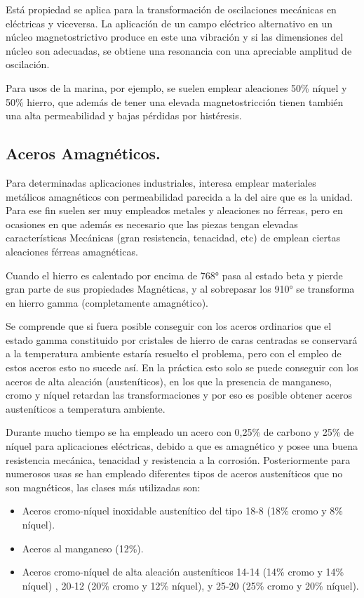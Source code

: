 \documentclass[12pt,a4paper]{article}
\begin{document}
Está propiedad se aplica para la transformación de oscilaciones mecánicas en eléctricas y viceversa. La aplicación de un campo eléctrico alternativo en un núcleo magnetostrictivo produce en este una vibración y si las dimensiones del núcleo son adecuadas, se obtiene una resonancia con una apreciable amplitud de oscilación.

Para usos de la marina, por ejemplo, se suelen emplear aleaciones 50\% níquel y 50\% hierro, que además de tener una elevada magnetostricción tienen también una alta permeabilidad y bajas pérdidas por histéresis.

\subsection{Aceros Amagnéticos.}

Para determinadas aplicaciones industriales, interesa emplear materiales metálicos amagnéticos con permeabilidad parecida a la del aire que es la unidad. Para ese fin suelen ser muy empleados metales y aleaciones no férreas, pero en ocasiones en que además es necesario que las piezas tengan elevadas características Mecánicas (gran resistencia, tenacidad, etc) de emplean ciertas aleaciones férreas amagnéticas.

Cuando el hierro es calentado por encima de 768° pasa al estado beta y pierde gran parte de sus propiedades Magnéticas, y al sobrepasar los 910° se transforma en hierro gamma (completamente amagnético).

Se comprende que si fuera posible conseguir con los aceros ordinarios que el estado gamma constituido por cristales de hierro de caras centradas se conservará a la temperatura ambiente estaría resuelto el problema, pero con el empleo de estos aceros esto no sucede así. En la práctica esto solo se puede conseguir con los aceros de alta aleación (austeníticos), en los que la presencia de manganeso, cromo y níquel retardan las transformaciones y por eso es posible obtener aceros austeníticos a temperatura ambiente.

Durante mucho tiempo se ha empleado un acero con 0,25\% de carbono y 25\% de níquel para aplicaciones eléctricas, debido a que es amagnético y posee una buena resistencia mecánica, tenacidad y resistencia a la corrosión. Posteriormente para numerosos usas se han empleado diferentes tipos de aceros austeníticos que no son magnéticos, las clases más utilizadas son: 

\begin{itemize}
    \item Aceros cromo-níquel inoxidable austenítico del tipo 18-8 (18\% cromo y 8\% níquel).
    \item Aceros al manganeso (12\%).
    \item Aceros cromo-níquel de alta aleación austeníticos 14-14 (14\% cromo y 14\% níquel) , 20-12 (20\% cromo y 12\% níquel), y 25-20 (25\% cromo y 20\% níquel).
\end{itemize}
\end{document}
